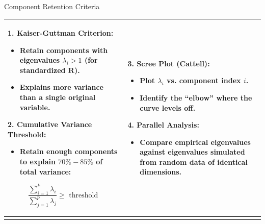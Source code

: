 \documentclass[aspectratio=169,ignorenonframetext]{beamer}
\begin{document}
\begin{frame}{Component Retention Criteria}
{\def\LTcaptype{none} %
\begin{longtable}[]{@{}
  >{\raggedright\arraybackslash}p{}
  >{\raggedright\arraybackslash}p{}@{}}
\toprule\noalign{}
\endhead
\begin{minipage}[t]{\linewidth}\raggedright
\textbf{1. Kaiser-Guttman Criterion:}

\begin{itemize}
\item
  Retain components with eigenvalues \(\lambda_{i} > 1\) (for
  standardized \(\mathbf{R}\)).
\item
  Explains more variance than a single original variable.
\end{itemize}

\textbf{2. Cumulative Variance Threshold:}

\begin{itemize}
\item
  Retain enough components to explain \(70\% - 85\%\) of total variance:
\end{itemize}

\[\frac{\sum_{i = 1}^{k}\lambda_{i}}{\sum_{j = 1}^{p}\lambda_{j}} \geq \text{ threshold }\]
\end{minipage} & \begin{minipage}[t]{\linewidth}\raggedright
\textbf{3. Scree Plot (Cattell):}

\begin{itemize}
\item
  Plot \(\lambda_{i}\) vs. component index \(i\).
\item
  Identify the ``elbow'' where the curve levels off.
\end{itemize}

\textbf{4. Parallel Analysis:}

\begin{itemize}
\item
  Compare empirical eigenvalues against eigenvalues simulated from
  random data of identical dimensions.
\end{itemize}
\end{minipage} \\
\bottomrule\noalign{}
\end{longtable}
}
\end{frame}
\end{document}
